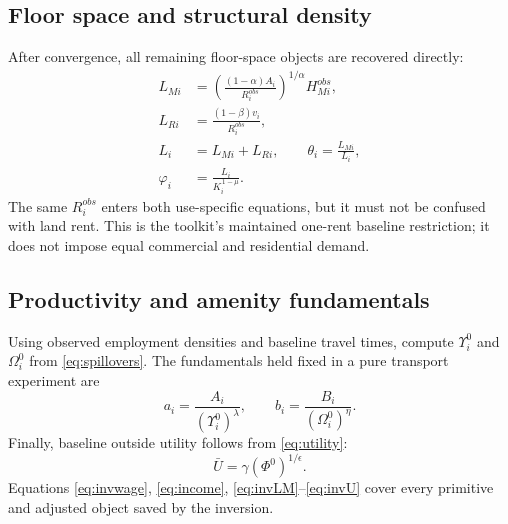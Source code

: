 \documentclass[11pt,a4paper]{article}
\begin{document}
\subsection{Floor space and structural density}
After convergence, all remaining floor-space objects are recovered directly:
\begin{align}
 L_{Mi}&=\left(\frac{(1-\alpha)A_i}{R_i^{obs}}\right)^{1/\alpha}H_{Mi}^{obs},
                                                               \label{eq:invLM}\\
 L_{Ri}&=\frac{(1-\beta)v_i}{R_i^{obs}},                        \label{eq:invLR}\\
 L_i&=L_{Mi}+L_{Ri},\qquad
 \theta_i=\frac{L_{Mi}}{L_i},                                  \label{eq:invtheta}\\
 \varphi_i&=\frac{L_i}{K_i^{\,1-\mu}}.                          \label{eq:invvarphi}
\end{align}
The same $R_i^{obs}$ enters both use-specific equations, but it must not be
confused with land rent. This is the toolkit's maintained one-rent baseline
restriction; it does not impose equal commercial and residential demand.

\subsection{Productivity and amenity fundamentals}
Using observed employment densities and baseline travel times, compute
$\Upsilon_i^0$ and $\Omega_i^0$ from \eqref{eq:spillovers}. The fundamentals
held fixed in a pure transport experiment are
\begin{equation}
 a_i=\frac{A_i}{(\Upsilon_i^0)^\lambda},\qquad
 b_i=\frac{B_i}{(\Omega_i^0)^\eta}.                        \label{eq:invfund}
\end{equation}
Finally, baseline outside utility follows from \eqref{eq:utility}:
\begin{equation}
 \bar U=\gamma(\Phi^0)^{1/\epsilon}.                       \label{eq:invU}
\end{equation}
Equations \eqref{eq:invwage}, \eqref{eq:income},
\eqref{eq:invLM}--\eqref{eq:invU} cover every primitive and adjusted object
saved by the inversion.
\end{document}

